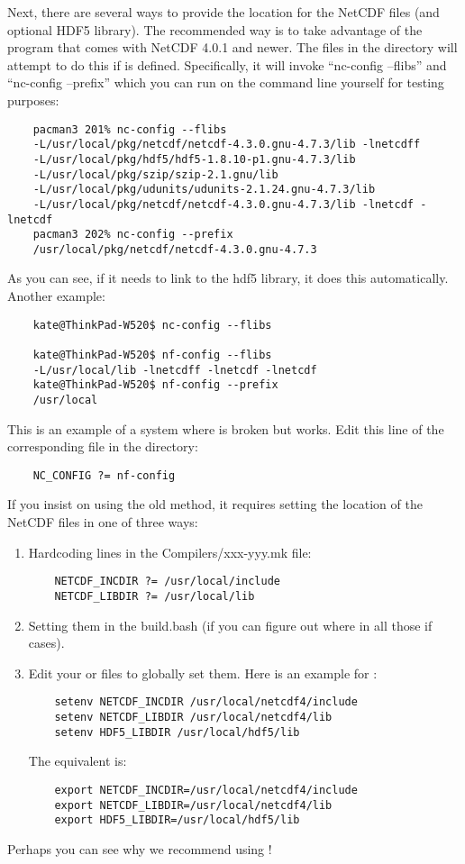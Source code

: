 Next, there are several ways to provide the location for the NetCDF
files (and optional HDF5 library). The recommended way is to take
advantage of the  program that comes with NetCDF 4.0.1
and newer. The files in the  directory will attempt
to do this if  is defined. Specifically, it will
invoke ``nc-config --flibs'' and ``nc-config --prefix'' which you can
run on the command line yourself for testing purposes:
\begin{verbatim}
    pacman3 201% nc-config --flibs
    -L/usr/local/pkg/netcdf/netcdf-4.3.0.gnu-4.7.3/lib -lnetcdff
    -L/usr/local/pkg/hdf5/hdf5-1.8.10-p1.gnu-4.7.3/lib
    -L/usr/local/pkg/szip/szip-2.1.gnu/lib
    -L/usr/local/pkg/udunits/udunits-2.1.24.gnu-4.7.3/lib
    -L/usr/local/pkg/netcdf/netcdf-4.3.0.gnu-4.7.3/lib -lnetcdf -lnetcdf
    pacman3 202% nc-config --prefix
    /usr/local/pkg/netcdf/netcdf-4.3.0.gnu-4.7.3
\end{verbatim}
As you can see, if it needs to link to the hdf5 library, it does
this automatically. Another example:
\begin{verbatim}
    kate@ThinkPad-W520$ nc-config --flibs

    kate@ThinkPad-W520$ nf-config --flibs
    -L/usr/local/lib -lnetcdff -lnetcdf -lnetcdf
    kate@ThinkPad-W520$ nf-config --prefix
    /usr/local
\end{verbatim}
This is an example of a system where  is broken but
 works. Edit this line of the corresponding file in the
 directory:
\begin{verbatim}
    NC_CONFIG ?= nf-config
\end{verbatim}
If you insist on using the old method, it requires setting the
location of the NetCDF files in one of three ways:
\begin{enumerate}
  \item Hardcoding lines in the Compilers/xxx-yyy.mk file:
\begin{verbatim}
    NETCDF_INCDIR ?= /usr/local/include
    NETCDF_LIBDIR ?= /usr/local/lib
\end{verbatim}
  \item Setting them in the build.bash (if you can figure out where in
all those if cases).
  \item Edit your  or  files to globally
set them. Here is an example for
:
\begin{verbatim}
    setenv NETCDF_INCDIR /usr/local/netcdf4/include
    setenv NETCDF_LIBDIR /usr/local/netcdf4/lib
    setenv HDF5_LIBDIR /usr/local/hdf5/lib
\end{verbatim}
The  equivalent is:
\begin{verbatim}
    export NETCDF_INCDIR=/usr/local/netcdf4/include
    export NETCDF_LIBDIR=/usr/local/netcdf4/lib
    export HDF5_LIBDIR=/usr/local/hdf5/lib
\end{verbatim}
\end{enumerate}
Perhaps you can see why we recommend using !

